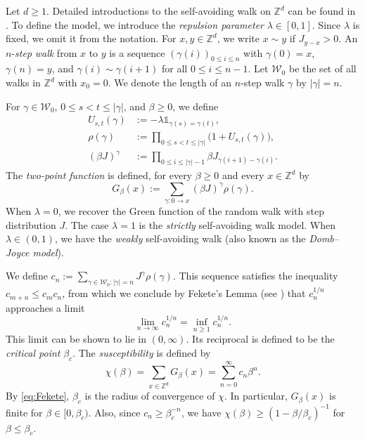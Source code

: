 \documentclass[11pt,a4paper]{article}
\numberwithin{equation}{section}
\theoremstyle{plain}
\theoremstyle{definition}
\newcommand\1{\mathds{1}}
\begin{document}
Let $d \ge 1$.
Detailed introductions to the self-avoiding walk on $\mathbb Z^d$ can be found in
\cite{MS93,BDGS12}.
To define the model, we introduce the  \emph{repulsion parameter}
$\lambda\in [0,1]$. Since $\lambda$ is fixed, we omit it from the notation.
For $x,y\in\mathbb{Z}^d$, we write $x \sim y$ if $J_{y-x} >0$. An $n$-\emph{step}
\emph{walk} from $x$ to $y$ is a sequence $(\gamma(i))_{0\leq i \leq n}$ with $\gamma(0) = x$, $\gamma(n) =y$, and $\gamma(i) \sim \gamma(i+1)$ for all $0\leq i \leq n-1$. Let $\mathcal{W}_0$ be the set of all walks in $\mathbb Z^d$ with $x_0=0$. We denote the length of an $n$-step walk $\gamma$ by $|\gamma|=n$.

For $\gamma\in \mathcal{W}_0$, $0\leq s<t\leq |\gamma|$, and $\beta \ge 0$, we define
\begin{align}
    U_{s,t}(\gamma)&:=-\lambda\mathds{1}_{\gamma(s)=\gamma(t)},
\\
\label{eq: defrho}
    \rho(\gamma) &:=\prod_{0\leq s<t\leq |\gamma|}\big(1+U_{s,t}(\gamma)\big),
    \\
    (\beta J)^{\gamma} &:=\prod_{0\leq i\leq |\gamma|-1}\beta J_{\gamma(i+1)-\gamma(i)}.
\end{align}
The \emph{two-point function} is defined, for every $\beta\geq0$ and every
$x\in \mathbb Z^d$ by
\begin{equation}\label{eq:def 2pt wsaw}
G_\beta(x):=\sum_{\gamma: 0\rightarrow x}(\beta J)^{\gamma}\rho(\gamma).
\end{equation}
When $\lambda=0$, we recover the Green function of the random walk with step distribution $J$.
The case $\lambda=1$ is the \emph{strictly} self-avoiding walk model.
When $\lambda \in (0,1)$, we have the \emph{weakly} self-avoiding walk
(also known as the \emph{Domb--Joyce model}).

We define
$c_n := \sum_{\gamma \in \mathcal W_0: |\gamma|=n} J^{\gamma}\rho(\gamma)$.
This sequence satisfies the inequality $c_{m+n} \le c_mc_n$, from which we conclude
by Fekete's Lemma (see \cite[Lemma~1.2.2]{MS93}) that $c_n^{1/n}$ approaches a
limit
\begin{equation}
\label{eq:Fekete}
    \lim_{n\to\infty}c_n^{1/n} = \inf_{n \ge 1} c_n^{1/n}.
\end{equation}
This limit can be shown to lie in $(0,\infty)$.
Its reciprocal is defined to
be the \emph{critical point} $\beta_c$.
The \emph{susceptibility} is defined by
\begin{equation}
    \chi(\beta) = \sum_{x\in\mathbb Z^d}G_\beta(x) = \sum_{n=0}^\infty c_n \beta^n.
\end{equation}
By \eqref{eq:Fekete}, $\beta_c$ is the radius of convergence of $\chi$. In particular, $G_\beta(x)$ is finite for $\beta\in [0,\beta_c)$.
Also, since $c_n \ge \beta_c^{-n}$, we have $\chi(\beta) \ge (1-\beta/\beta_c)^{-1}$ for $\beta \le \beta_c$.
\end{document}
